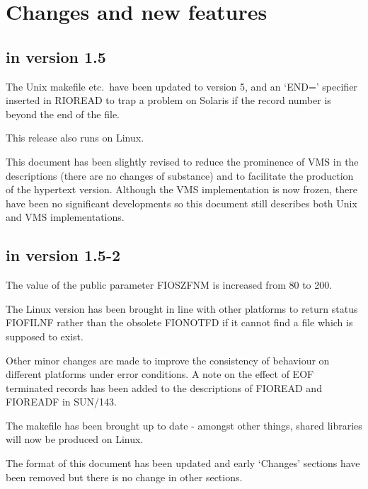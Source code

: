 \documentclass[twoside,11pt]{article}
\renewcommand{\_}{\texttt{\symbol{95}}}
\begin{document}
\section{Changes and new features}

\subsection{in version 1.5}
The Unix makefile etc.\ have been updated to version 5, and an `END='
specifier inserted in RIO\_READ to trap a problem on Solaris if the record 
number is beyond the end of the file.

This release also runs on Linux.

This document has been slightly revised to reduce the prominence of VMS in the
descriptions (there are no changes of substance) and to facilitate the
production of the hypertext version.
Although the VMS implementation is now frozen, there have been no significant
developments so this document still describes both Unix and VMS implementations.


\subsection{in version 1.5-2}
The value of the public parameter FIO\_\_SZFNM is increased from 80 to
200.

The Linux version has been brought in line with other platforms to return
status FIO\_\_FILNF rather than the obsolete FIO\_\_NOTFD if it cannot find a
file which is supposed to exist.

Other minor changes are made to improve the consistency of behaviour
on different platforms under error conditions. A note on the effect of EOF
terminated records has been added to the descriptions of FIO\_READ and
FIO\_READF in SUN/143.


The makefile has been brought up to date - amongst other things, shared
libraries will now be produced on Linux.

The format of this document has been updated and early `Changes' sections have
been removed but there is no change in other sections.
\end{document}
